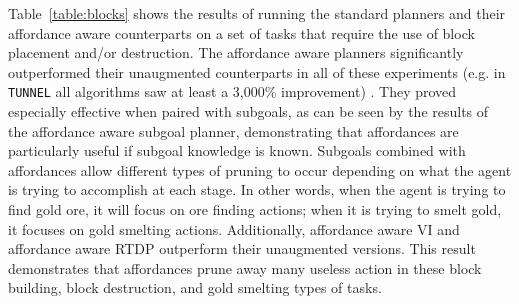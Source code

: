 \documentclass[]{article}
\begin{document}
Table~\ref{table:blocks} shows the results of running the standard
planners and their affordance aware counterparts on a set of tasks
that require the use of block placement and/or destruction.  The
affordance aware planners significantly outperformed their unaugmented
counterparts in all of these experiments (e.g. in \texttt{TUNNEL} all algorithms saw at least a 3,000\% improvement) . They proved
especially effective when paired with subgoals, as can be seen by the
results of the affordance aware subgoal planner, demonstrating that
affordances are particularly useful if subgoal knowledge is known.
Subgoals combined with affordances allow different types of pruning to
occur depending on what the agent is trying to accomplish at each
stage. In other words, when the agent is trying to find gold ore, it will
focus on ore finding actions; when it is trying to smelt gold, it
focuses on gold smelting actions.  Additionally, affordance aware VI
and affordance aware RTDP outperform their unaugmented versions.  This
result demonstrates that affordances prune away many useless action in
these block building, block destruction, and gold smelting types of
tasks. 
\end{document}
